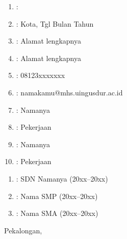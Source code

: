 %
%
%
{\centering {}\par}
\vspace*{1cm}

\begin{spacing}{1.125}
\noindent{}

\begin{enumerate}[labelindent=0em,labelsep=0em,itemsep=0em]
 \item {} : \penulis
 \item {} : Kota, Tgl Bulan Tahun
 \item {} : Alamat lengkapnya
 \item {} : Alamat lengkapnya
 \item {} : 08123xxxxxxx
 \item {} : namakamu@mhs.uingusdur.ac.id
 \item {} : Namanya
 \item {} : Pekerjaan
 \item {} : Namanya
 \item {} : Pekerjaan
\end{enumerate}

\noindent{}

\begin{enumerate}[labelindent=0em,labelsep=0em,itemsep=0em]
 \item {} : SDN Namanya (20xx--20xx)
 \item {} : Nama SMP (20xx--20xx)
 \item {} : Nama SMA (20xx--20xx)
\end{enumerate}

\vspace*{1cm}
\begin{ttdkanan}
 Pekalongan, \tanggalPengesahan\\[4em]


 \penulis
\end{ttdkanan}


\end{spacing}
